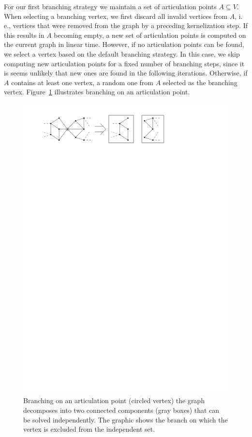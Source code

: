 \documentclass[a4paper,UKenglish,cleveref, autoref, thm-restate]{lipics-v2021}
\newcommand{\ie}{i.\,e.,\xspace}
\begin{document}
For our first branching strategy we maintain a set of articulation points $A \subseteq V$.
When selecting a branching vertex, we first discard all invalid vertices from $A$, \ie vertices that were removed from the graph by a preceding kernelization step.
If this results in $A$ becoming empty, a new set of articulation points is computed on the current graph in linear time.
However, if no articulation points can be found, we select a vertex based on the default branching strategy.
In this case, we skip computing new articulation points for a fixed number of branching steps, since it is seems unlikely that new ones are found in the following iterations.
Otherwise, if $A$ contains at least one vertex, a random one from $A$ selected as the branching
vertex. Figure~\ref{fig:articulation_points} illustrates branching on an
articulation point.

\begin{figure}[t]
  \centering
  \includegraphics[scale=1]{figures/articulation_points}
  \caption{Branching on an articulation point (circled vertex) the
    graph decomposes into two connected components (gray boxes) that can be
    solved independently. The graphic shows the branch on which the vertex is
    excluded from the independent set.}
  \label{fig:articulation_points}
\end{figure}
\end{document}
